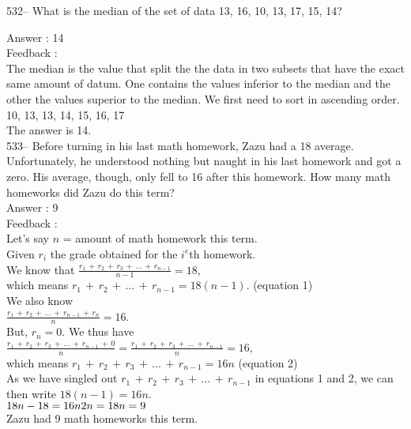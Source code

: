 \documentclass[letterpaper, 12pt]{article}
\begin{document}
532-- What is the median of the set of data 13, 16, 10, 13, 17,
15, 14?

Answer : 14\\

Feedback :\\
The median is the value that split the the data in two subsets that have the exact same amount of datum. One contains the values inferior to the median and the other the values superior to the median. We first need to sort in ascending order.\\
10, 13, 13, 14, 15, 16, 17 \\
The answer is 14.\\

533-- Before turning in his last math homework, Zazu had a 18 average. Unfortunately, he understood nothing but naught in his last homework and got a zero. His average, though, only fell to 16 after this homework. How many math homeworks did Zazu do this term?\\

Answer : 9\\

Feedback : \\
Let's say $n$ = amount of math homework this term.\\
Given $r_i$ the grade obtained for the $i^{e}$th homework.\\[2mm]
We know that
$\frac{r_{1}\,+\,r_{2}\,+\,r_{3}\,+\,\ldots\,+\,r_{n-1}}{n-1}=18$,\\[2mm]
which means $r_{1}\,+\,r_{2}\,+\,\ldots\,+\,r_{n-1} =18(n-1)$. \qquad
(equation 1)\\[2mm]
We also know \\[2mm]
$\frac{r_{1}\,+\,r_{2}\,+\,\ldots\,+\,r_{n-1}\,+\,r_{n}}{n}=16$.\\[2mm]
But, $r_{n}=0$.  We thus have\\[2mm]
$\frac{r_{1}\,+\,r_{2}\,+\,r_{3}\,+\,\ldots\,+\,r_{n-1}\,+\,0}{n}=\frac{r_{1}\,+\,r_{2}\,+\,r_{3}\,+\,\ldots\,+\,r_{n-1}}{n}=16$,\\[2mm]
which means $r_{1}\,+\,r_{2}\,+\,r_{3}\,+\,\ldots\,+\,r_{n-1}=16n$ \qquad
(equation 2)\\[2mm]
As we have singled out
$r_{1}\,+\,r_{2}\,+\,r_{3}\,+\,\ldots\,+\,r_{n-1}$ in equations 1 and 2,
we can then write $18\left( n-1\right) = 16n$.\\
$18n-18=16n\\
2n=18\\
n=9$\\
Zazu had 9 math homeworks this term.\\
\end{document}
